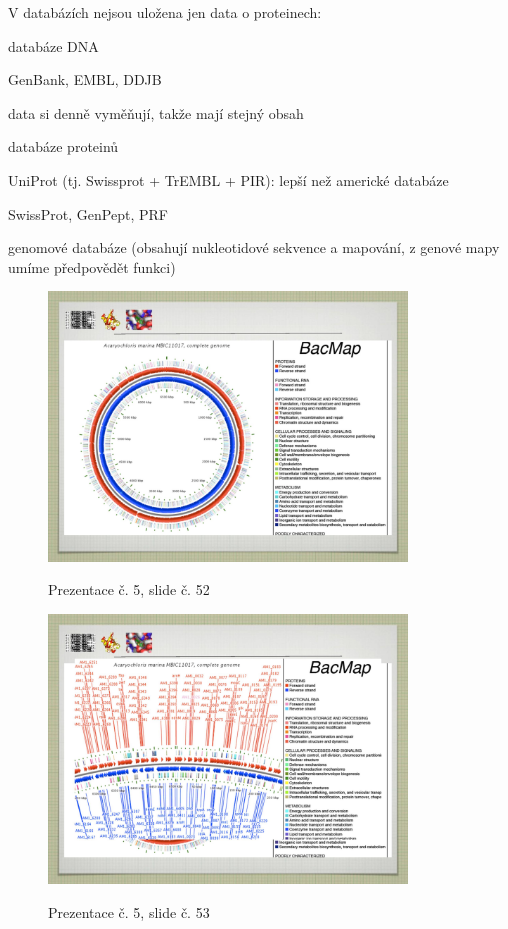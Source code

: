 \documentclass[DIV=8]{scrreprt}
\begin{document}
V databázích nejsou uložena jen data o proteinech:
\begin{myItemize}[nosep]
    \item databáze DNA
\begin{myItemize}[nosep]
    \item GenBank, EMBL, DDJB
    \item data si denně vyměňují, takže mají stejný obsah
\end{myItemize}

    \item databáze proteinů
\begin{myItemize}[nosep]
    \item UniProt (tj. Swissprot + TrEMBL + PIR): lepší než americké databáze
    \item SwissProt, GenPept, PRF
\end{myItemize}

    \item genomové databáze (obsahují nukleotidové sekvence a mapování, z genové mapy umíme předpovědět funkci) \begin{figure}
    \caption{Prezentace č. 5, slide č. 52}
    \includegraphics[width=0.85\textwidth]{slides-5/slide-52.jpg}
    \centering
    \label{slides-5-slide-52}
\end{figure}
\begin{figure}
    \caption{Prezentace č. 5, slide č. 53}
    \includegraphics[width=0.85\textwidth]{slides-5/slide-53.jpg}
    \centering
    \label{slides-5-slide-53}
\end{figure}


\end{myItemize}
\end{document}
